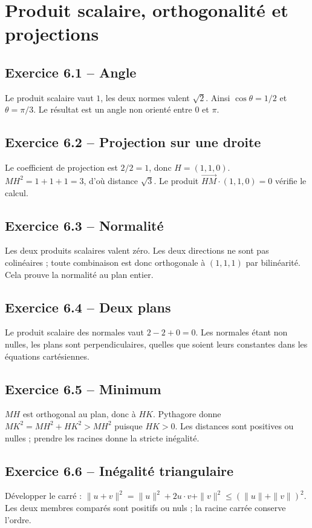 \chapter{Produit scalaire, orthogonalité et projections}
\section*{Exercice 6.1 -- Angle}
Le produit scalaire vaut $1$, les deux normes valent $\sqrt2$. Ainsi $\cos\theta=1/2$ et $\theta=\pi/3$. Le résultat est un angle non orienté entre $0$ et $\pi$.

\section*{Exercice 6.2 -- Projection sur une droite}
Le coefficient de projection est $2/2=1$, donc $H=(1,1,0)$. $MH^2=1+1+1=3$, d'où distance $\sqrt3$. Le produit $\overrightarrow{HM}\cdot(1,1,0)=0$ vérifie le calcul.

\section*{Exercice 6.3 -- Normalité}
Les deux produits scalaires valent zéro. Les deux directions ne sont pas colinéaires ; toute combinaison est donc orthogonale à $(1,1,1)$ par bilinéarité. Cela prouve la normalité au plan entier.

\section*{Exercice 6.4 -- Deux plans}
Le produit scalaire des normales vaut $2-2+0=0$. Les normales étant non nulles, les plans sont perpendiculaires, quelles que soient leurs constantes dans les équations cartésiennes.

\section*{Exercice 6.5 -- Minimum}
$MH$ est orthogonal au plan, donc à $HK$. Pythagore donne $MK^2=MH^2+HK^2>MH^2$ puisque $HK>0$. Les distances sont positives ou nulles ; prendre les racines donne la stricte inégalité.

\section*{Exercice 6.6 -- Inégalité triangulaire}
Développer le carré : $\|u+v\|^2=\|u\|^2+2u\cdot v+\|v\|^2\le(\|u\|+\|v\|)^2$. Les deux membres comparés sont positifs ou nuls ; la racine carrée conserve l'ordre.
